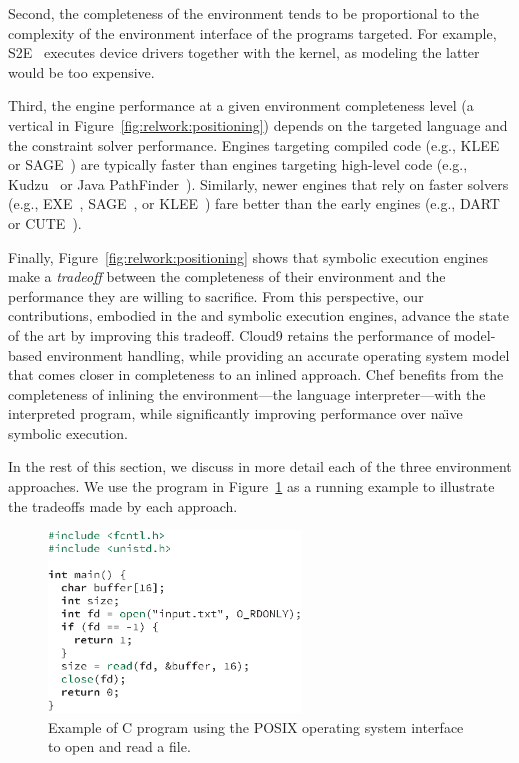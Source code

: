 Second, the completeness of the environment tends to be proportional to the complexity of the environment interface of the programs targeted.
%
For example, S2E~\cite{s2eSystem} executes device drivers together with the kernel, as modeling the latter would be too expensive.

Third, the engine performance at a given environment completeness level (a vertical in Figure~\ref{fig:relwork:positioning}) depends on the targeted language and the constraint solver performance.
%
Engines targeting compiled code (e.g., KLEE~\cite{klee} or SAGE~\cite{godefroid:fuzz}) are typically faster than engines targeting high-level code (e.g., Kudzu~\cite{saxena-kudzu} or Java PathFinder~\cite{jpf-symbex}).
%
Similarly, newer engines that rely on faster solvers (e.g., EXE~\cite{exe}, SAGE~\cite{godefroid:fuzz}, or KLEE~\cite{klee}) fare better than the early engines (e.g., DART~\cite{dart} or CUTE~\cite{cute}).

Finally, Figure~\ref{fig:relwork:positioning} shows that symbolic execution engines make a \emph{tradeoff} between the completeness of their environment and the performance they are willing to sacrifice.
%
From this perspective, our contributions, embodied in the \chef and \cnine symbolic execution engines, advance the state of the art by improving this tradeoff.
%
Cloud9 retains the performance of model-based environment handling, while providing an accurate operating system model that comes closer in completeness to an inlined approach.
%
Chef benefits from the completeness of inlining the environment---the language interpreter---with the interpreted program, while significantly improving performance over na\"{\i}ve symbolic execution.

In the rest of this section, we discuss in more detail each of the three environment approaches.
%
We use the program in Figure~\ref{fig:relwork:example} as a running example to illustrate the tradeoffs made by each approach.

\begin{figure}
  \centering
  \includegraphics[width=0.6\textwidth]{relatedwork/figures/environment-example}
  \caption{Example of C program using the POSIX operating system interface to open and read a file.}
  \label{fig:relwork:example}
\end{figure}

